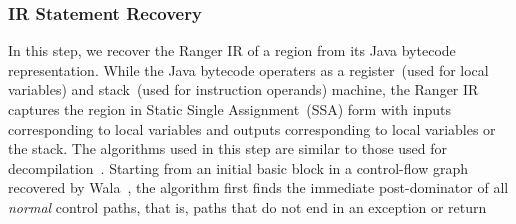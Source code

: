 
\subsubsection{IR Statement Recovery}
%
In this step, we recover the Ranger IR of a region from its Java bytecode representation.
%
While the Java bytecode operaters as a register~(used for local variables) and stack~(used for instruction operands)
machine, the Ranger IR captures the region in Static Single Assignment~(SSA) form with inputs corresponding to
local variables and outputs corresponding to local variables or the stack.
%
The algorithms used in this step are similar to those used for decompilation~\cite{Yakdan15@decompilation}. %
%
Starting from an initial basic block in a control-flow graph recovered by Wala~\cite{Wala}, the algorithm first finds
the immediate post-dominator of all {\em normal} control paths, that is, paths that do not end in an exception or return
